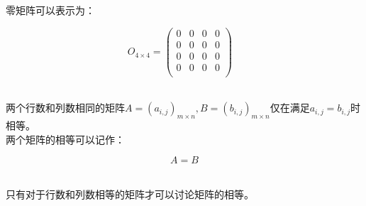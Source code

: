 \documentclass[UTF8]{ctexart}
\begin{document}
    零矩阵可以表示为：
    \begin{large}
        \begin{equation*}
            O_{4\times 4}=
            \begin{pmatrix}
                0&0&0&0\\
                0&0&0&0\\
                0&0&0&0\\
                0&0&0&0\\
            \end{pmatrix}~~~~
        \end{equation*}
    \end{large}\\[2mm]
    两个行数和列数相同的矩阵$A=(a_{i,j})_{m\times n},B=(b_{i,j})_{m\times n}$仅在满足$a_{i,j}=b_{i,j}$时相等。\\[3mm]
    两个矩阵的相等可以记作：
    \begin{large}
        \begin{equation*}
            A=B
        \end{equation*}
    \end{large}\\
    只有对于行数和列数相等的矩阵才可以讨论矩阵的相等。

\newpage
\end{document}
